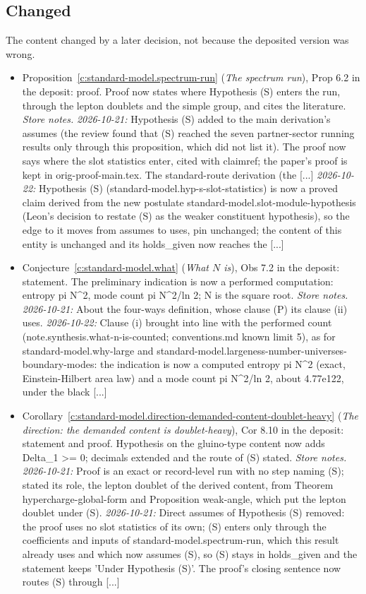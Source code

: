 \documentclass[11pt]{article}
\theoremstyle{definition}
\theoremstyle{plain}
\begin{document}
\subsection*{Changed}
The content changed by a later decision, not because the deposited version was wrong.
\begin{itemize}\setlength{\itemsep}{2pt}
\item Proposition~\ref{c:standard-model.spectrum-run} (\emph{The spectrum run}), Prop 6.2 in the deposit: proof. Proof now states where Hypothesis (S) enters the run, through the lepton doublets and the simple group, and cites the literature. \emph{Store notes.} \emph{2026-10-21:} Hypothesis (S) added to the main derivation's assumes (the review found that (S) reached the seven partner-sector running results only through this proposition, which did not list it). The proof now says where the slot statistics enter, cited with claimref; the paper's proof is kept in orig-proof-main.tex. The standard-route derivation (the [...] \emph{2026-10-22:} Hypothesis (S) (standard-model.hyp-s-slot-statistics) is now a proved claim derived from the new postulate standard-model.slot-module-hypothesis (Leon's decision to restate (S) as the weaker constituent hypothesis), so the edge to it moves from assumes to uses, pin unchanged; the content of this entity is unchanged and its holds\_given now reaches the [...]
\item Conjecture~\ref{c:standard-model.what} (\emph{What $N$ is}), Obs 7.2 in the deposit: statement. The preliminary indication is now a performed computation: entropy pi N\^{}2, mode count pi N\^{}2/ln 2; N is the square root. \emph{Store notes.} \emph{2026-10-21:} About the four-ways definition, whose clause (P) its clause (ii) uses. \emph{2026-10-22:} Clause (i) brought into line with the performed count (note.synthesis.what-n-is-counted; conventions.md known limit 5), as for standard-model.why-large and standard-model.largeness-number-universes-boundary-modes: the indication is now a computed entropy pi N\^{}2 (exact, Einstein-Hilbert area law) and a mode count pi N\^{}2/ln 2, about 4.77e122, under the black [...]
\item Corollary~\ref{c:standard-model.direction-demanded-content-doublet-heavy} (\emph{The direction: the demanded content is doublet-heavy}), Cor 8.10 in the deposit: statement and proof. Hypothesis on the gluino-type content now adds Delta\_1 >= 0; decimals extended and the route of (S) stated. \emph{Store notes.} \emph{2026-10-21:} Proof is an exact or record-level run with no step naming (S); stated its role, the lepton doublet of the derived content, from Theorem hypercharge-global-form and Proposition weak-angle, which put the lepton doublet under (S). \emph{2026-10-21:} Direct assumes of Hypothesis (S) removed: the proof uses no slot statistics of its own; (S) enters only through the coefficients and inputs of standard-model.spectrum-run, which this result already uses and which now assumes (S), so (S) stays in holds\_given and the statement keeps 'Under Hypothesis (S)'. The proof's closing sentence now routes (S) through [...]

\end{itemize}
\end{document}

